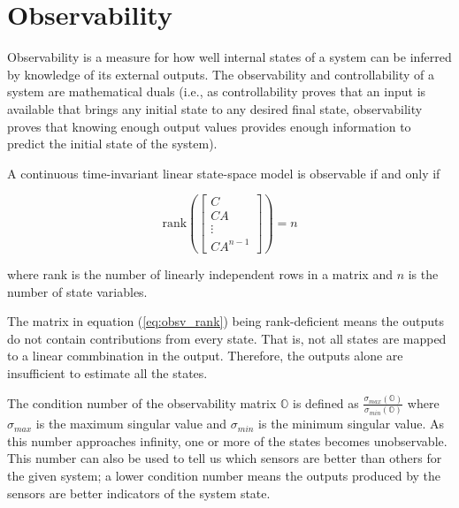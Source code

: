 \section{Observability}

Observability is a measure for how well internal \glspl{state} of a \gls{system}
can be inferred by knowledge of its external \glspl{output}. The observability
and controllability of a \gls{system} are mathematical duals (i.e., as
controllability proves that an \gls{input} is available that brings any initial
\gls{state} to any desired final \gls{state}, observability proves that knowing
enough \gls{output} values provides enough information to predict the initial
\gls{state} of the \gls{system}).

\begin{theorem}[Observability]
  A continuous \gls{time-invariant} linear state-space \gls{model} is observable
  if and only if

  \begin{equation}
    \text{rank} \left(
    \begin{bmatrix}
      C \\
      CA \\
      \vdots \\
      CA^{n-1}
    \end{bmatrix}\right) = n \label{eq:obsv_rank}
  \end{equation}

  where rank is the number of linearly independent rows in a matrix and $n$ is
  the number of \gls{state} variables.
\end{theorem}

The matrix in equation (\ref{eq:obsv_rank}) being rank-deficient means the
\glspl{output} do not contain contributions from every \gls{state}. That is, not
all \glspl{state} are mapped to a linear commbination in the \gls{output}.
Therefore, the \glspl{output} alone are insufficient to estimate all the
\glspl{state}.

The condition number of the observability matrix $\mathbb{O}$ is defined as
$\frac{\sigma_{max}(\mathbb{O})}{\sigma_{min}(\mathbb{O})}$ where $\sigma_{max}$
is the maximum singular value and $\sigma_{min}$ is
the minimum singular value. As this number approaches infinity, one or more of
the \glspl{state} becomes unobservable. This number can also be used to tell us
which sensors are better than others for the given \gls{system}; a lower
condition number means the \glspl{output} produced by the sensors are better
indicators of the \gls{system} \gls{state}.
